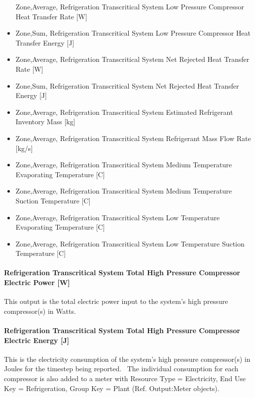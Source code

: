 \begin{itemize}
  Zone,Average, Refrigeration Transcritical System Low Pressure Compressor Heat Transfer Rate {[}W{]}
\item
  Zone,Sum, Refrigeration Transcritical System Low Pressure Compressor Heat Transfer Energy {[}J{]}
\item
  Zone,Average, Refrigeration Transcritical System Net Rejected Heat Transfer Rate {[}W{]}
\item
  Zone,Sum, Refrigeration Transcritical System Net Rejected Heat Transfer Energy {[}J{]}
\item
  Zone,Average, Refrigeration Transcritical System Estimated Refrigerant Inventory Mass {[}kg{]}
\item
  Zone,Average, Refrigeration Transcritical System Refrigerant Mass Flow Rate {[}kg/s{]}
\item
  Zone,Average, Refrigeration Transcritical System Medium Temperature Evaporating Temperature {[}C{]}
\item
  Zone,Average, Refrigeration Transcritical System Medium Temperature Suction Temperature {[}C{]}
\item
  Zone,Average, Refrigeration Transcritical System Low Temperature Evaporating Temperature {[}C{]}
\item
  Zone,Average, Refrigeration Transcritical System Low Temperature Suction Temperature {[}C{]}
\end{itemize}

\paragraph{Refrigeration Transcritical System Total High Pressure Compressor Electric Power {[}W{]}}\label{refrigeration-transcritical-system-total-high-pressure-compressor-electric-power-w}

This output is the total electric power input to the system's high pressure compressor(s) in Watts.

\paragraph{Refrigeration Transcritical System Total High Pressure Compressor Electric Energy {[}J{]}}\label{refrigeration-transcritical-system-total-high-pressure-compressor-electric-energy-j}

This is the electricity consumption of the system's high pressure compressor(s) in Joules for the timestep being reported.~ The individual consumption for each compressor is also added to a meter with Resource Type = Electricity, End Use Key = Refrigeration, Group Key = Plant (Ref. Output:Meter objects).

